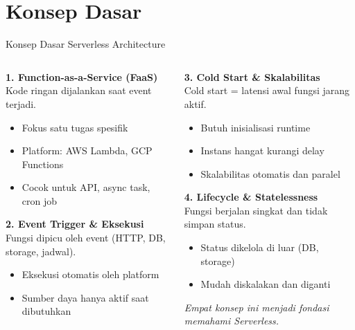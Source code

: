 \documentclass[aspectratio=169, table]{beamer}
\begin{document}
	
	\section{Konsep Dasar}
	
	\begin{frame}[fragile]{Konsep Dasar Serverless Architecture}
		\vspace{10pt}
		\begin{columns}[T]
			\begin{column}{0.5\textwidth}
				\textbf{1. Function-as-a-Service (FaaS)} \\
				Kode ringan dijalankan saat event terjadi.
				\begin{itemize}
					\item Fokus satu tugas spesifik
					\item Platform: AWS Lambda, GCP Functions
					\item Cocok untuk API, async task, cron job
				\end{itemize}
				
				\vspace{6pt}
				\textbf{2. Event Trigger \& Eksekusi} \\
				Fungsi dipicu oleh event (HTTP, DB, storage, jadwal).
				\begin{itemize}
					\item Eksekusi otomatis oleh platform
					\item Sumber daya hanya aktif saat dibutuhkan
				\end{itemize}
			\end{column}
			
			\begin{column}{0.5\textwidth}
				\textbf{3. Cold Start \& Skalabilitas} \\
				Cold start = latensi awal fungsi jarang aktif.
				\begin{itemize}
					\item Butuh inisialisasi runtime
					\item Instans hangat kurangi delay
					\item Skalabilitas otomatis dan paralel
				\end{itemize}
				
				\vspace{6pt}
				\textbf{4. Lifecycle \& Statelessness} \\
				Fungsi berjalan singkat dan tidak simpan status.
				\begin{itemize}
					\item Status dikelola di luar (DB, storage)
					\item Mudah diskalakan dan diganti
				\end{itemize}
				
				\vspace{4pt}
				\scriptsize
				\textit{Empat konsep ini menjadi fondasi memahami Serverless.}
			\end{column}
		\end{columns}
	\end{frame}
	
\end{document}
